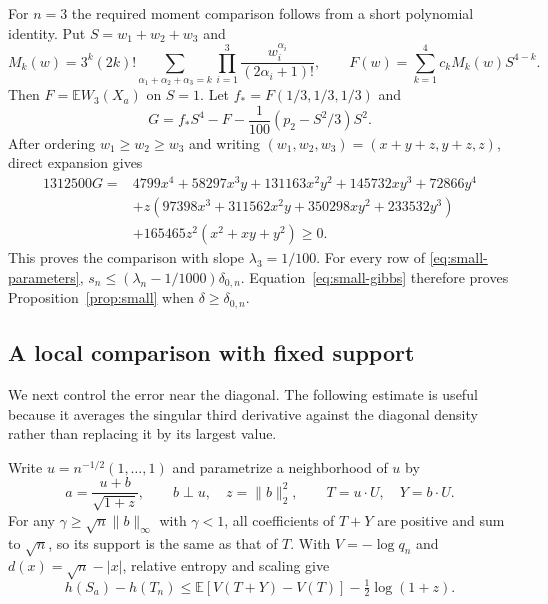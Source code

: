 \documentclass[11pt,a4paper]{article}
\theoremstyle{remark}\newtheorem{remark}[theorem]{Remark}
\newcommand{\E}{\mathbb E}
\begin{document}
For $n=3$ the required moment comparison follows from a short polynomial
identity. Put $S=w_1+w_2+w_3$ and
\[
 M_k(w)=3^k(2k)!\sum_{\alpha_1+\alpha_2+\alpha_3=k}
       \prod_{i=1}^3\frac{w_i^{\alpha_i}}{(2\alpha_i+1)!},
 \qquad F(w)=\sum_{k=1}^4c_kM_k(w)S^{4-k}.
\]
Then $F=\E W_3(X_a)$ on $S=1$. Let $f_*=F(1/3,1/3,1/3)$ and
\[
 G=f_*S^4-F-\frac1{100}(p_2-S^2/3)S^2.
\]
After ordering $w_1\ge w_2\ge w_3$ and writing
$(w_1,w_2,w_3)=(x+y+z,y+z,z)$, direct expansion gives
\begin{align*}
 1312500G={}&4799x^4+58297x^3y+131163x^2y^2
                  +145732xy^3+72866y^4\\
 &+z(97398x^3+311562x^2y+350298xy^2+233532y^3)\\
 &+165465z^2(x^2+xy+y^2)\ge0.
\end{align*}
This proves the comparison with slope $\lambda_3=1/100$.
For every row of \eqref{eq:small-parameters},
$s_n\le(\lambda_n-1/1000)\delta_{0,n}$. Equation~\eqref{eq:small-gibbs}
therefore proves Proposition~\ref{prop:small} when $\delta\ge\delta_{0,n}$.

\subsection{A local comparison with fixed support}
We next control the error near the diagonal. The following estimate is
useful because it averages the singular third derivative against the
diagonal density rather than replacing it by its largest value.

Write $u=n^{-1/2}(1,\ldots,1)$ and parametrize a neighborhood of $u$ by
\[
 a=\frac{u+b}{\sqrt{1+z}},\qquad b\perp u,
 \quad z=\|b\|_2^2,\qquad T=u\cdot U,\quad Y=b\cdot U.
\]
For any $\gamma\ge\sqrt n\|b\|_\infty$ with $\gamma<1$, all coefficients of $T+Y$ are
positive and sum to $\sqrt n$, so its support is the same as that of $T$.
With $V=-\log q_n$ and $d(x)=\sqrt n-|x|$, relative entropy and scaling
give
\begin{equation}\label{eq:small-fixed-support}
 h(S_a)-h(T_n)
 \le \E[V(T+Y)-V(T)]-\tfrac12\log(1+z).
\end{equation}
\end{document}
